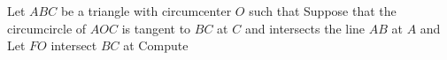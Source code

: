 Let $ABC$ be a triangle with circumcenter $O$ such that  Suppose that the circumcircle of $AOC$ is tangent to $BC$ at $C$ and intersects the line $AB$ at $A$ and  Let $FO$ intersect $BC$ at  Compute 